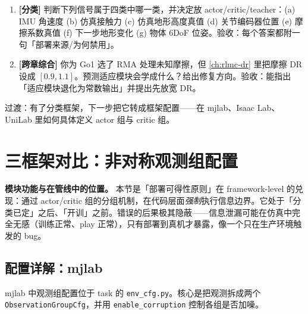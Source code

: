 \begin{practice}[本节练习]
\begin{enumerate}
  \item \textbf{[分类]} 判断下列信号属于四类中哪一类，并决定放 actor/critic/teacher：(a) IMU 角速度 (b) 仿真接触力 (c) 仿真地形高度真值 (d) 关节编码器位置 (e) 摩擦系数真值 (f) 下一步地形变化 (g) 物体 6DoF 位姿。验收：每个答案都附一句「部署来源/为何禁用」。
  \item \textbf{[跨章综合]} 你为 Go1 选了 RMA 处理未知摩擦，但 \cref{ch:rlmc-dr} 里把摩擦 DR 设成 $[0.9,1.1]$。预测适应模块会学成什么？给出修复方向。验收：能指出「适应模块退化为常数输出」并提出先放宽 DR。
\end{enumerate}
\end{practice}

过渡：有了分类框架，下一步把它转成框架配置——在 mjlab、Isaac Lab、UniLab 里如何具体定义 actor 组与 critic 组。

\section{三框架对比：非对称观测组配置}
\label{sec:rlmc-priv-config}

\textbf{模块功能与在管线中的位置。} 本节是「部署可得性原则」在 framework-level 的兑现：通过 actor/critic 组的分组机制，在代码层面\emph{强制}执行信息边界。它处于「分类已定」之后、「开训」之前。错误的后果极其隐蔽——信息泄漏可能在仿真中完全无感（训练正常、play 正常），只有部署到真机才暴露，像一个只在生产环境触发的 bug。

\subsection{配置详解：mjlab}
\label{sec:rlmc-priv-cfg-mjlab}

mjlab 中观测组配置位于 task 的 \verb|env_cfg.py|。核心是把观测拆成两个 \verb|ObservationGroupCfg|，并用 \verb|enable_corruption| 控制各组是否加噪。

